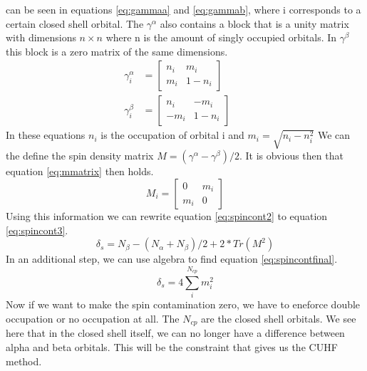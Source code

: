 \documentclass[twoside,twocolumn,9pt]{article}
\begin{document}
can be seen in equations \eqref{eq:gammaa} and \eqref{eq:gammab}, where i corresponds to a certain closed shell orbital. The $\gamma^\alpha$ also contains a block that is a 
unity matrix with dimensions $n\times n$ where n is the amount of singly occupied orbitals. In $\gamma^\beta$ this block is a zero matrix of the same dimensions.
\begin{subequations}
  \begin{align}
  \label{eq:gammaa}
  \gamma^\alpha_i &= \begin{bmatrix}
    n_i & m_i \\
    m_i & 1- n_i
  \end{bmatrix}&& \\
  \label{eq:gammab}
  \gamma^\beta_i &= \begin{bmatrix}
    n_i & -m_i \\
    -m_i & 1-n_i
  \end{bmatrix}&&
\end{align}
\end{subequations}
 In these equations $n_i$ is the occupation of orbital i and $m_i = \sqrt{n_i - n_i^2}$\cite{Scuseria2010} We can the define the spin density matrix $M = (\gamma^\alpha - \gamma^\beta)/2$. It is obvious then that equation \eqref{eq:mmatrix} then holds.
 \begin{equation}\label{eq:mmatrix}
   M_i = \begin{bmatrix}
     0 & m_i \\
     m_i & 0
   \end{bmatrix}
 \end{equation}
Using this information we can rewrite equation \eqref{eq:spincont2} to equation \eqref{eq:spincont3}\cite{Scuseria2010}.
\begin{equation}\label{eq:spincont3}
  \delta_s = N_\beta - (N_\alpha + N_\beta)/2 + 2*Tr(M^2)
\end{equation}
In an additional step, we can use algebra to find equation \eqref{eq:spincontfinal}.
\begin{equation}\label{eq:spincontfinal}
  \delta_s = 4\sum^{N_{cp}}_i m_i^2
\end{equation}
Now if we want to make the spin contamination zero, we have to eneforce double occupation or no occupation at all. The $N_{cp}$ are the closed shell orbitals. We see here that in 
the closed shell itself, we can no longer have a difference between alpha and beta orbitals. This will be the constraint that gives us the CUHF method.
\end{document}
